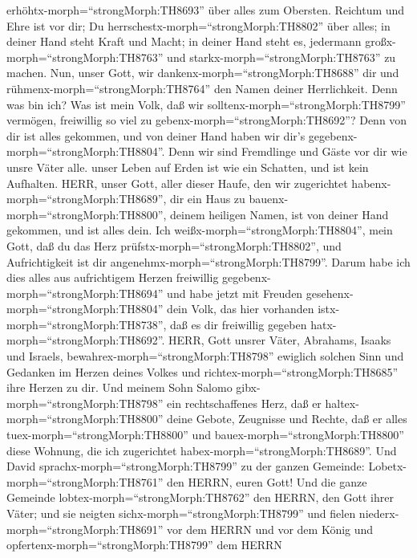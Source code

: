 erhöhtx-morph=``strongMorph:TH8693'' über alles zum Obersten.
 Reichtum und Ehre ist vor dir; Du
herrschestx-morph=``strongMorph:TH8802'' über alles; in deiner Hand
steht Kraft und Macht; in deiner Hand steht es, jedermann
großx-morph=``strongMorph:TH8763'' und
starkx-morph=``strongMorph:TH8763'' zu machen.  Nun, unser
Gott, wir dankenx-morph=``strongMorph:TH8688'' dir und
rühmenx-morph=``strongMorph:TH8764'' den Namen deiner Herrlichkeit.
 Denn was bin ich? Was ist mein Volk, daß wir
solltenx-morph=``strongMorph:TH8799'' vermögen, freiwillig so viel zu
gebenx-morph=``strongMorph:TH8692''? Denn von dir ist alles gekommen,
und von deiner Hand haben wir dir's
gegebenx-morph=``strongMorph:TH8804''.  Denn wir sind
Fremdlinge und Gäste vor dir wie unsre Väter alle. unser Leben auf Erden
ist wie ein Schatten, und ist kein Aufhalten.  HERR, unser
Gott, aller dieser Haufe, den wir zugerichtet
habenx-morph=``strongMorph:TH8689'', dir ein Haus zu
bauenx-morph=``strongMorph:TH8800'', deinem heiligen Namen, ist von
deiner Hand gekommen, und ist alles dein.  Ich
weißx-morph=``strongMorph:TH8804'', mein Gott, daß du das Herz
prüfstx-morph=``strongMorph:TH8802'', und Aufrichtigkeit ist dir
angenehmx-morph=``strongMorph:TH8799''. Darum habe ich dies alles aus
aufrichtigem Herzen freiwillig gegebenx-morph=``strongMorph:TH8694'' und
habe jetzt mit Freuden gesehenx-morph=``strongMorph:TH8804'' dein Volk,
das hier vorhanden istx-morph=``strongMorph:TH8738'', daß es dir
freiwillig gegeben hatx-morph=``strongMorph:TH8692''. 
HERR, Gott unsrer Väter, Abrahams, Isaaks und Israels,
bewahrex-morph=``strongMorph:TH8798'' ewiglich solchen Sinn und Gedanken
im Herzen deines Volkes und richtex-morph=``strongMorph:TH8685'' ihre
Herzen zu dir.  Und meinem Sohn Salomo
gibx-morph=``strongMorph:TH8798'' ein rechtschaffenes Herz, daß er
haltex-morph=``strongMorph:TH8800'' deine Gebote, Zeugnisse und Rechte,
daß er alles tuex-morph=``strongMorph:TH8800'' und
bauex-morph=``strongMorph:TH8800'' diese Wohnung, die ich zugerichtet
habex-morph=``strongMorph:TH8689''.  Und David
sprachx-morph=``strongMorph:TH8799'' zu der ganzen Gemeinde:
Lobetx-morph=``strongMorph:TH8761'' den HERRN, euren Gott! Und die ganze
Gemeinde lobtex-morph=``strongMorph:TH8762'' den HERRN, den Gott ihrer
Väter; und sie neigten sichx-morph=``strongMorph:TH8799'' und fielen
niederx-morph=``strongMorph:TH8691'' vor dem HERRN und vor dem König
 und opfertenx-morph=``strongMorph:TH8799'' dem HERRN
